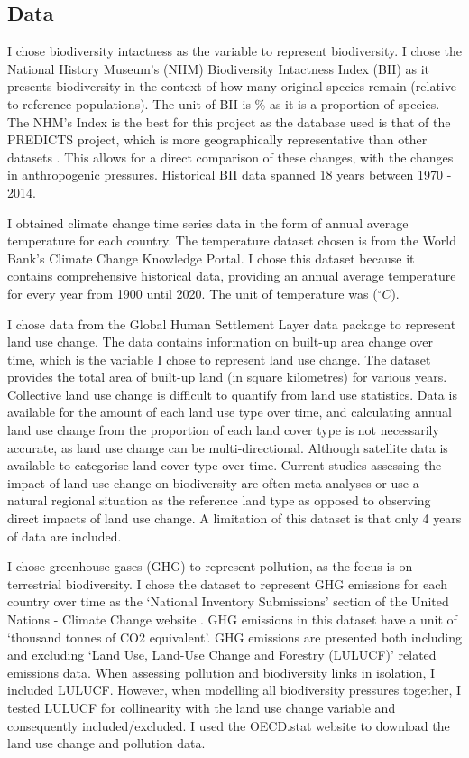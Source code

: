 \documentclass[11pt, a4paper, titlepage]{article}
\begin{document}
	\subsection*{Data}
	I chose biodiversity intactness as the variable to represent biodiversity. I chose the National History Museum's (NHM) Biodiversity Intactness Index (BII)\citep{phillips2021} as it presents biodiversity in the context of how many original species remain (relative to reference populations). The unit of BII is \% as it is a proportion of species. The NHM's Index is the best for this project as the database used is that of the PREDICTS project, which is more geographically representative than other datasets \citep{purvis2018modelling}. This allows for a direct comparison of these changes, with the changes in anthropogenic pressures. Historical BII data spanned 18 years between 1970 - 2014. 
	
	I obtained climate change time series data in the form of annual average temperature for each country. The temperature dataset chosen is from the World Bank's Climate Change Knowledge Portal. I chose this dataset because it contains comprehensive historical data, providing an annual average temperature for every year from 1900 until 2020. The unit of temperature was ($^\circ C$).
	
	I chose data from the Global Human Settlement Layer data package \citep{JRC117104} to represent land use change. The data contains information on built-up area change over time, which is the variable I chose to represent land use change. The dataset provides the total area of built-up land (in square kilometres) for various years. Collective land use change is difficult to quantify from land use statistics. Data is available for the amount of each land use type over time, and calculating annual land use change from the proportion of each land cover type is not necessarily accurate, as land use change can be multi-directional. Although satellite data is available to categorise land cover type over time. Current studies assessing the impact of land use change on biodiversity are often meta-analyses or use a natural regional situation as the reference land type \citep{de2013land} as opposed to observing direct impacts of land use change. A limitation of this dataset is that only 4 years of data are included. 
	
	I chose greenhouse gases (GHG) to represent pollution, as the focus is on terrestrial biodiversity. I chose the dataset to represent GHG emissions for each country over time as the `National Inventory Submissions' section of the United Nations - Climate Change website \citep{UN2022}. GHG emissions in this dataset have a unit of `thousand tonnes of CO2 equivalent'. GHG emissions are presented both including and excluding `Land Use, Land-Use Change and Forestry (LULUCF)' related emissions data. When assessing pollution and biodiversity links in isolation, I included LULUCF. However, when modelling all biodiversity pressures together, I tested LULUCF for collinearity with the land use change variable and consequently included/excluded. I used the OECD.stat website to download the land use change and pollution data. 
	
\end{document}

